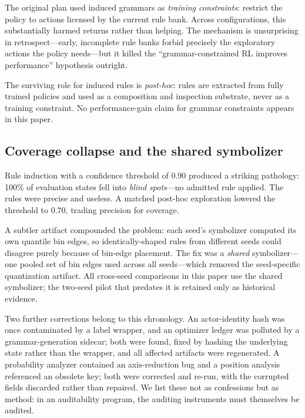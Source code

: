 \documentclass[11pt]{article}
\begin{document}
The original plan used induced grammars as \textit{training constraints}: restrict the policy to actions licensed by the current rule bank. Across configurations, this substantially harmed returns rather than helping. The mechanism is unsurprising in retrospect---early, incomplete rule banks forbid precisely the exploratory actions the policy needs---but it killed the ``grammar-constrained RL improves performance'' hypothesis outright.

The surviving role for induced rules is \textit{post-hoc}: rules are extracted from fully trained policies and used as a composition and inspection substrate, never as a training constraint. No performance-gain claim for grammar constraints appears in this paper.

\subsection{Coverage collapse and the shared symbolizer}

Rule induction with a confidence threshold of $0.90$ produced a striking pathology: 100\% of evaluation states fell into \textit{blind spots}---no admitted rule applied. The rules were precise and useless. A matched post-hoc exploration lowered the threshold to $0.70$, trading precision for coverage.

A subtler artifact compounded the problem: each seed's symbolizer computed its own quantile bin edges, so identically-shaped rules from different seeds could disagree purely because of bin-edge placement. The fix was a \textit{shared} symbolizer---one pooled set of bin edges used across all seeds---which removed the seed-specific quantization artifact. All cross-seed comparisons in this paper use the shared symbolizer; the two-seed pilot that predates it is retained only as historical evidence.

Two further corrections belong to this chronology. An actor-identity hash was once contaminated by a label wrapper, and an optimizer ledger was polluted by a grammar-generation sidecar; both were found, fixed by hashing the underlying state rather than the wrapper, and all affected artifacts were regenerated. A probability analyzer contained an axis-reduction bug and a position analysis referenced an obsolete key; both were corrected and re-run, with the corrupted fields discarded rather than repaired. We list these not as confessions but as method: in an auditability program, the auditing instruments must themselves be audited.
\end{document}
